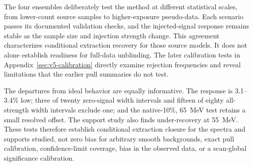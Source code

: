 The four ensembles deliberately test the method at different statistical scales,
from lower-count source samples to higher-exposure pseudo-data. Each scenario passes
its documented validation checks, and the injected-signal response remains stable
as the sample size and injection strength change. This agreement characterizes conditional extraction recovery for those source
models. It does not alone establish readiness for full-data unblinding. The later
calibration tests in Appendix~\ref{sec:v5-calibration} directly examine rejection
frequencies and reveal limitations that the earlier pull summaries do not test.

The departures from ideal behavior are equally informative. The response is 3.1--3.4\%
low; three of twenty zero-signal width intervals and fifteen of eighty all-strength
width intervals exclude one; and the native-10\%, 65~MeV test retains a small resolved
offset. The support study also finds under-recovery at 55~MeV. These tests therefore
establish conditional extraction closure for the spectra and supports studied, not
zero bias for arbitrary smooth backgrounds, exact pull calibration, confidence-limit
coverage, bias in the observed data, or a scan-global significance calibration.
